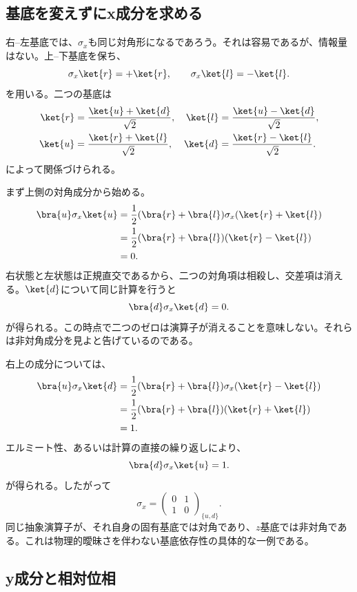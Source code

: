 \subsection{基底を変えずにx成分を求める}

右--左基底では、\(\sigma_x\)も同じ対角形になるであろう。それは容易であるが、情報量はない。上--下基底を保ち、
\begin{equation}
\sigma_x\ket{r}=+\ket{r},
\qquad
\sigma_x\ket{l}=-\ket{l}.
\label{eq:sigma-x-eigenvectors}
\end{equation}
を用いる。二つの基底は
\begin{align}
\ket{r}&=\frac{\ket{u}+\ket{d}}{\sqrt2},&
\ket{l}&=\frac{\ket{u}-\ket{d}}{\sqrt2},\\
\ket{u}&=\frac{\ket{r}+\ket{l}}{\sqrt2},&
\ket{d}&=\frac{\ket{r}-\ket{l}}{\sqrt2}.
\label{eq:x-z-basis-relations}
\end{align}
によって関係づけられる。

まず上側の対角成分から始める。
\begin{align}
\bra{u}\sigma_x\ket{u}
 &=\frac12(\bra{r}+\bra{l})\sigma_x(\ket{r}+\ket{l})\\
 &=\frac12(\bra{r}+\bra{l})(\ket{r}-\ket{l})\\
 &=0.
\end{align}
右状態と左状態は正規直交であるから、二つの対角項は相殺し、交差項は消える。\(\ket{d}\)について同じ計算を行うと
\[
\bra{d}\sigma_x\ket{d}=0.
\]
が得られる。この時点で二つのゼロは演算子が消えることを意味しない。それらは非対角成分を見よと告げているのである。

右上の成分については、
\begin{align}
\bra{u}\sigma_x\ket{d}
 &=\frac12(\bra{r}+\bra{l})\sigma_x(\ket{r}-\ket{l})\\
 &=\frac12(\bra{r}+\bra{l})(\ket{r}+\ket{l})\\
 &=1.
\end{align}
エルミート性、あるいは計算の直接の繰り返しにより、
\[
\bra{d}\sigma_x\ket{u}=1.
\]
が得られる。したがって
\begin{equation}
\boxed{
\sigma_x=
\begin{pmatrix}
0&1\\
1&0
\end{pmatrix}_{\{u,d\}}.}
\label{eq:sigma-x}
\end{equation}
同じ抽象演算子が、それ自身の固有基底では対角であり、\(z\)基底では非対角である。これは物理的曖昧さを伴わない基底依存性の具体的な一例である。

\subsection{y成分と相対位相}

